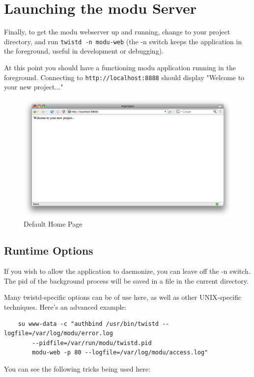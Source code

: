 \section{Launching the modu Server}

Finally, to get the modu webserver up and running, change to your project
directory, and run \verb|twistd -n modu-web| (the -n switch keeps the
application in the foreground, useful in development or debugging).

At this point you should have a functioning modu application running in the
foreground. Connecting to \verb|http://localhost:8888| should display
"Welcome to your new project..."

\begin{figure}[ht]
\centering
\includegraphics[width=1\textwidth]{images/admin-intro/01-main-page.png}
\caption{Default Home Page}
\end{figure}

\subsection{Runtime Options}
If you wish to allow the application to daemonize, you can leave off the -n
switch. The pid of the background process will be saved in a file in the 
current directory.

Many twistd-specific options can be of use here, as well as other 
UNIX-specific techniques. Here's an advanced example:

\begin{verbatim}
    su www-data -c "authbind /usr/bin/twistd --logfile=/var/log/modu/error.log
        --pidfile=/var/run/modu/twistd.pid
        modu-web -p 80 --logfile=/var/log/modu/access.log"
\end{verbatim}

You can see the following tricks being used here:

